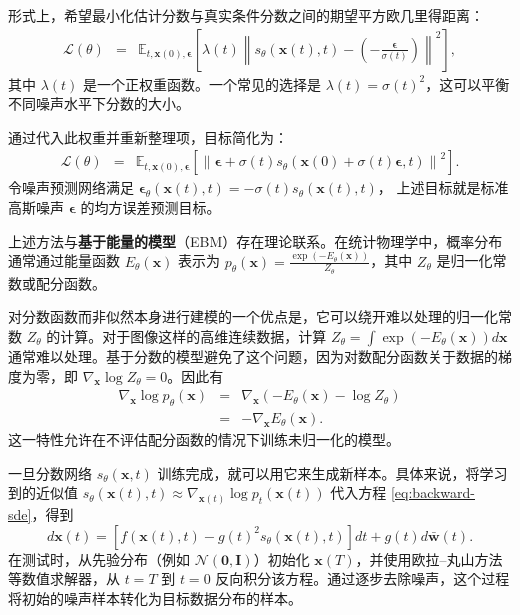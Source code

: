 \documentclass[UTF8,a4paper,zihao=-4,oneside,openany]{ctexbook}
\begin{document}
形式上，希望最小化估计分数与真实条件分数之间的期望平方欧几里得距离：
\begin{eqnarray}
\mathcal{L}(\theta) & = & \mathbb{E}_{t, \mathbf{x}(0), \boldsymbol{\epsilon}} \left[ \lambda(t) \left\| s_\theta(\mathbf{x}(t), t) - \left( -\frac{\boldsymbol{\epsilon}}{\sigma(t)} \right) \right\|^2 \right],
\end{eqnarray}
其中 $\lambda(t)$ 是一个正权重函数。一个常见的选择是 $\lambda(t) = \sigma(t)^2$，这可以平衡不同噪声水平下分数的大小。

通过代入此权重并重新整理项，目标简化为：
\begin{eqnarray}
\mathcal{L}(\theta) & = & \mathbb{E}_{t, \mathbf{x}(0), \boldsymbol{\epsilon}} \left[ \left\| \boldsymbol{\epsilon} + \sigma(t) s_\theta(\mathbf{x}(0) + \sigma(t)\boldsymbol{\epsilon}, t) \right\|^2 \right].
\end{eqnarray}
令噪声预测网络满足
$\boldsymbol{\epsilon}_\theta(\mathbf{x}(t),t)=-\sigma(t)s_\theta(\mathbf{x}(t),t)$，
上述目标就是标准高斯噪声 $\boldsymbol{\epsilon}$ 的均方误差预测目标。

上述方法与\textbf{基于能量的模型}（EBM）存在理论联系。在统计物理学中，概率分布通常通过能量函数 $E_\theta(\mathbf{x})$ 表示为 $p_\theta(\mathbf{x}) = \frac{\exp(-E_\theta(\mathbf{x}))}{Z_\theta}$，其中 $Z_\theta$ 是归一化常数或配分函数。

对分数函数而非似然本身进行建模的一个优点是，它可以绕开难以处理的归一化常数 $Z_\theta$ 的计算。对于图像这样的高维连续数据，计算 $Z_\theta = \int \exp(-E_\theta(\mathbf{x})) d\mathbf{x}$ 通常难以处理。基于分数的模型避免了这个问题，因为对数配分函数关于数据的梯度为零，即 $\nabla_{\mathbf{x}} \log Z_\theta = 0$。因此有
\begin{eqnarray}
\nabla_{\mathbf{x}} \log p_\theta(\mathbf{x}) & = & \nabla_{\mathbf{x}} \left( -E_\theta(\mathbf{x}) - \log Z_\theta \right) \nonumber \\
& = & -\nabla_{\mathbf{x}} E_\theta(\mathbf{x}).
\end{eqnarray}
这一特性允许在不评估配分函数的情况下训练未归一化的模型。

一旦分数网络 $s_\theta(\mathbf{x}, t)$ 训练完成，就可以用它来生成新样本。具体来说，将学习到的近似值 $s_\theta(\mathbf{x}(t), t) \approx \nabla_{\mathbf{x}(t)} \log p_t(\mathbf{x}(t))$ 代入方程 \eqref{eq:backward-sde}，得到
\begin{equation}
d\mathbf{x}(t) = \left[ f(\mathbf{x}(t), t) - g(t)^2 s_\theta(\mathbf{x}(t), t) \right] dt + g(t) d\bar{\mathbf{w}}(t).
\label{eq:learned-reverse-sde}
\end{equation}
在测试时，从先验分布（例如 $\mathcal{N}(\mathbf{0}, \mathbf{I})$）初始化 $\mathbf{x}(T)$，并使用欧拉--丸山方法等数值求解器，从 $t=T$ 到 $t=0$ 反向积分该方程。通过逐步去除噪声，这个过程将初始的噪声样本转化为目标数据分布的样本。
\end{document}
